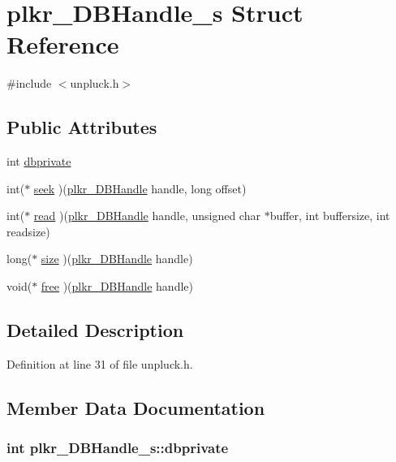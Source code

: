 \hypertarget{structplkr__DBHandle__s}{\section{plkr\+\_\+\+D\+B\+Handle\+\_\+s Struct Reference}
\label{structplkr__DBHandle__s}
}


{\ttfamily \#include $<$unpluck.\+h$>$}

\subsection*{Public Attributes}
\begin{DoxyCompactItemize}
\item 
int \hyperlink{structplkr__DBHandle__s_a8524d7cbaf5756ba6af798cbfa84e77f}{dbprivate}
\item 
int($\ast$ \hyperlink{structplkr__DBHandle__s_aca1e04dbcb61b099a145d7771c951fa2}{seek} )(\hyperlink{unpluck_8h_a74fbfe35b87f9a4c762e6a099cb849d5}{plkr\+\_\+\+D\+B\+Handle} handle, long offset)
\item 
int($\ast$ \hyperlink{structplkr__DBHandle__s_a0ab0715537eb77ede37a911b6593be9d}{read} )(\hyperlink{unpluck_8h_a74fbfe35b87f9a4c762e6a099cb849d5}{plkr\+\_\+\+D\+B\+Handle} handle, unsigned char $\ast$buffer, int buffersize, int readsize)
\item 
long($\ast$ \hyperlink{structplkr__DBHandle__s_abbdac090fcc71fa8fc750ae06f442776}{size} )(\hyperlink{unpluck_8h_a74fbfe35b87f9a4c762e6a099cb849d5}{plkr\+\_\+\+D\+B\+Handle} handle)
\item 
void($\ast$ \hyperlink{structplkr__DBHandle__s_a5040a81f7438fbb5a987e825a3e3df63}{free} )(\hyperlink{unpluck_8h_a74fbfe35b87f9a4c762e6a099cb849d5}{plkr\+\_\+\+D\+B\+Handle} handle)
\end{DoxyCompactItemize}


\subsection{Detailed Description}


Definition at line 31 of file unpluck.\+h.



\subsection{Member Data Documentation}
\hypertarget{structplkr__DBHandle__s_a8524d7cbaf5756ba6af798cbfa84e77f}{
\subsubsection[{dbprivate}]{\setlength{\rightskip}{0pt plus 5cm}int plkr\+\_\+\+D\+B\+Handle\+\_\+s\+::dbprivate}}\label{structplkr__DBHandle__s_a8524d7cbaf5756ba6af798cbfa84e77f}


